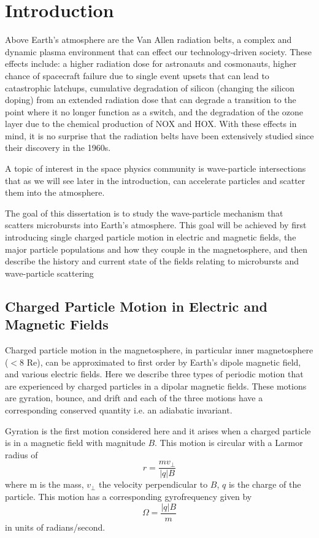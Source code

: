 \chapter{Introduction}\label{CH:introduction}
Above Earth's atmosphere are the Van Allen radiation belts, a complex and dynamic plasma environment that can effect our technology-driven society. These effects include: a higher radiation dose for astronauts and cosmonauts, higher chance of spacecraft failure due to single event upsets that can lead to catastrophic latchups, cumulative degradation of silicon (changing the silicon doping) from an extended radiation dose that can degrade a transition to the point where it no longer function as a switch, and the degradation of the ozone layer due to the chemical production of NOX and HOX. With these effects in mind, it is no surprise that the radiation belts have been extensively studied since their discovery in the 1960s.

A topic of interest in the space physics community is wave-particle intersections that as we will see later in the introduction, can accelerate particles and scatter them into the atmosphere.

The goal of this dissertation is to study the wave-particle mechanism that scatters microbursts into Earth's atmosphere. This goal will be achieved by first introducing single charged particle motion in electric and magnetic fields, the major particle populations and how they couple in the magnetosphere, and then describe the history and current state of the fields relating to microbursts and wave-particle scattering

\section{Charged Particle Motion in Electric and Magnetic Fields}\label{Intro:particle_motion}
Charged particle motion in the magnetosphere, in particular inner magnetosphere ($< 8$ Re), can be approximated to first order by Earth's dipole magnetic field, and various electric fields. Here we describe three types of periodic motion that are experienced by charged particles in a dipolar magnetic fields. These motions are gyration, bounce, and drift and each of the three motions have a corresponding conserved quantity i.e. an adiabatic invariant. 

Gyration is the first motion considered here and it arises when a charged particle is in a magnetic field with magnitude $B$. This motion is circular with a Larmor radius of 
\begin{equation}
r = \frac{m v_\perp}{|q| B}
\end{equation} where m is the mass, $v_\perp$ the velocity perpendicular to $B$, $q$ is the charge of the particle. This motion has a corresponding gyrofrequency given by 
\begin{equation}
\Omega = \frac{|q| B}{m}
\end{equation} in units of radians/second.

